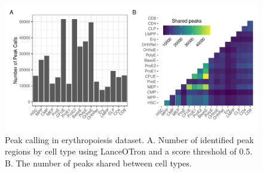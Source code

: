 \begin{figure}
  \centering
  \includegraphics[width=\textwidth]{plot/ch4/ludwig_shared_peaks.pdf}
  \caption{Peak calling in erythropoiesis dataset. A. Number of identified peak regions by cell type using LanceOTron and a score threshold of 0.5. B. The number of peaks shared between cell types.}
  \label{fig:ludwig_shared_peaks}
\end{figure}

